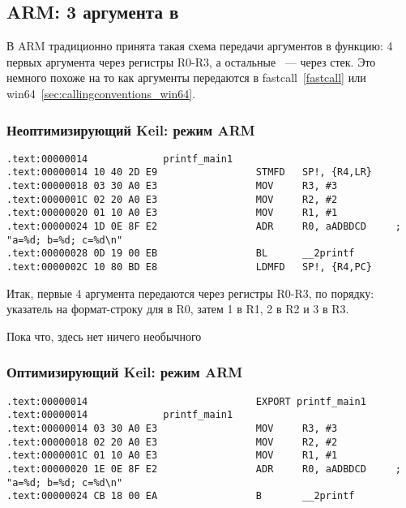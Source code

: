 \subsection{ARM: 3 аргумента в \printf}

В ARM традиционно принята такая схема передачи аргументов в функцию: 4 первых аргумента через регистры R0-R3,
а остальные ~--- через стек. Это немного похоже на то как аргументы передаются в fastcall~\ref{fastcall} или 
win64~\ref{sec:callingconventions_win64}.

\subsubsection{Неоптимизирующий Keil: режим ARM}

\begin{lstlisting}
.text:00000014             printf_main1
.text:00000014 10 40 2D E9                 STMFD   SP!, {R4,LR}
.text:00000018 03 30 A0 E3                 MOV     R3, #3
.text:0000001C 02 20 A0 E3                 MOV     R2, #2
.text:00000020 01 10 A0 E3                 MOV     R1, #1
.text:00000024 1D 0E 8F E2                 ADR     R0, aADBDCD     ; "a=%d; b=%d; c=%d\n"
.text:00000028 0D 19 00 EB                 BL      __2printf
.text:0000002C 10 80 BD E8                 LDMFD   SP!, {R4,PC}
\end{lstlisting}

Итак, первые 4 аргумента передаются через регистры R0-R3, по порядку: указатель на формат-строку для \printf
в R0, затем 1 в R1, 2 в R2 и 3 в R3. 

Пока что, здесь нет ничего необычного

\subsubsection{Оптимизирующий Keil: режим ARM}
\label{ARM_B_to_printf}

\begin{lstlisting}
.text:00000014                             EXPORT printf_main1
.text:00000014             printf_main1
.text:00000014 03 30 A0 E3                 MOV     R3, #3
.text:00000018 02 20 A0 E3                 MOV     R2, #2
.text:0000001C 01 10 A0 E3                 MOV     R1, #1
.text:00000020 1E 0E 8F E2                 ADR     R0, aADBDCD     ; "a=%d; b=%d; c=%d\n"
.text:00000024 CB 18 00 EA                 B       __2printf
\end{lstlisting}

